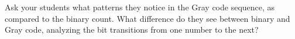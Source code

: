 





Ask your students what patterns they notice in the Gray code sequence, as compared to the binary count.  What difference do they see between binary and Gray code, analyzing the bit transitions from one number to the next?




